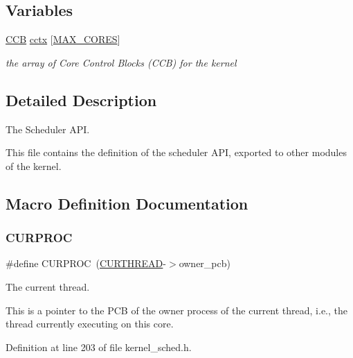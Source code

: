 \subsection*{Variables}
\begin{DoxyCompactItemize}
\item 
\mbox{\label{group__scheduler_ga3be3b151b275926dff3fb99bee765eab}} 
\hyperlink{group__scheduler_ga7485b31e0dd9fd723bc2d75fba5206a0}{C\+CB} \hyperlink{group__scheduler_ga3be3b151b275926dff3fb99bee765eab}{cctx} \mbox{[}\hyperlink{bios_8h_a009855593b59738d24dbfc236edb3b14}{M\+A\+X\+\_\+\+C\+O\+R\+ES}\mbox{]}
\begin{DoxyCompactList}\small\item\em the array of Core Control Blocks (C\+CB) for the kernel \end{DoxyCompactList}\end{DoxyCompactItemize}


\subsection{Detailed Description}
The Scheduler A\+PI. 

This file contains the definition of the scheduler A\+PI, exported to other modules of the kernel. 

\subsection{Macro Definition Documentation}
\mbox{\label{group__scheduler_gae3437e8e6787ef05b6576d03c5b6a0ca}} 
\subsubsection{\texorpdfstring{C\+U\+R\+P\+R\+OC}{CURPROC}}
{\footnotesize\ttfamily \#define C\+U\+R\+P\+R\+OC~(\hyperlink{group__scheduler_ga587a82c8931f0df72f43cc913ceb7e27}{C\+U\+R\+T\+H\+R\+E\+AD}-\/$>$owner\+\_\+pcb)}



The current thread. 

This is a pointer to the P\+CB of the owner process of the current thread, i.\+e., the thread currently executing on this core. 

Definition at line 203 of file kernel\+\_\+sched.\+h.

